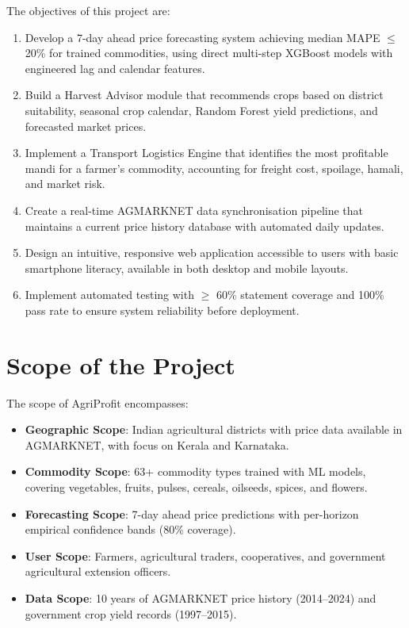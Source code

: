 \documentclass[12pt,a4paper]{report}
\begin{document}
The objectives of this project are:
\begin{enumerate}
    \item Develop a 7-day ahead price forecasting system achieving median MAPE $\leq$ 20\%
    for trained commodities, using direct multi-step XGBoost models with engineered
    lag and calendar features.
    \item Build a Harvest Advisor module that recommends crops based on district suitability,
    seasonal crop calendar, Random Forest yield predictions, and forecasted market prices.
    \item Implement a Transport Logistics Engine that identifies the most profitable mandi
    for a farmer's commodity, accounting for freight cost, spoilage, hamali, and market risk.
    \item Create a real-time AGMARKNET data synchronisation pipeline that maintains a
    current price history database with automated daily updates.
    \item Design an intuitive, responsive web application accessible to users with basic
    smartphone literacy, available in both desktop and mobile layouts.
    \item Implement automated testing with $\geq$ 60\% statement coverage and 100\% pass
    rate to ensure system reliability before deployment.
\end{enumerate}

\section{Scope of the Project}

The scope of AgriProfit encompasses:
\begin{itemize}
    \item \textbf{Geographic Scope}: Indian agricultural districts with price data available
    in AGMARKNET, with focus on Kerala and Karnataka.
    \item \textbf{Commodity Scope}: 63+ commodity types trained with ML models, covering
    vegetables, fruits, pulses, cereals, oilseeds, spices, and flowers.
    \item \textbf{Forecasting Scope}: 7-day ahead price predictions with per-horizon
    empirical confidence bands (80\% coverage).
    \item \textbf{User Scope}: Farmers, agricultural traders, cooperatives, and government
    agricultural extension officers.
    \item \textbf{Data Scope}: 10 years of AGMARKNET price history (2014--2024) and
    government crop yield records (1997--2015).
\end{itemize}
\end{document}
